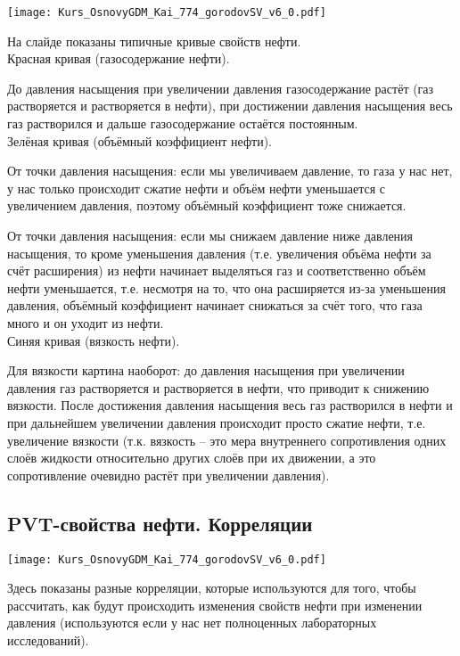 \documentclass[main.tex]{subfiles}
\begin{document}
\texttt{[image: Kurs\_OsnovyGDM\_Kai\_774\_gorodovSV\_v6\_0.pdf]}

На слайде показаны типичные кривые свойств нефти.
\\

Красная кривая (газосодержание нефти).

До давления насыщения при увеличении давления газосодержание растёт (газ растворяется и растворяется в нефти), при достижении давления насыщения весь газ растворился и дальше газосодержание остаётся постоянным.
\\

Зелёная кривая (объёмный коэффициент нефти).

От точки давления насыщения: если мы увеличиваем давление, то газа у нас нет, у нас только происходит сжатие нефти и объём нефти уменьшается с увеличением давления, поэтому объёмный коэффициент тоже снижается.

От точки давления насыщения: если мы снижаем давление ниже давления насыщения, то кроме уменьшения давления (т.е. увеличения объёма нефти за счёт расширения) из нефти начинает выделяться газ и соответственно объём нефти уменьшается, т.е. несмотря на то, что она расширяется из-за уменьшения давления, объёмный коэффициент начинает снижаться за счёт того, что газа много и он уходит из нефти.
\\

Синяя кривая (вязкость нефти).

Для вязкости картина наоборот: до давления насыщения при увеличении давления газ растворяется и растворяется в нефти, что приводит к снижению вязкости.
После достижения давления насыщения весь газ растворился в нефти и при дальнейшем увеличении давления происходит просто сжатие нефти, т.е. увеличение вязкости (т.к. вязкость -- это мера внутреннего сопротивления одних слоёв жидкости относительно других слоёв при их движении, а это сопротивление очевидно растёт при увеличении давления).

\subsection{PVT-свойства нефти. Корреляции}

\texttt{[image: Kurs\_OsnovyGDM\_Kai\_774\_gorodovSV\_v6\_0.pdf]}

Здесь показаны разные корреляции, которые используются для того, чтобы рассчитать, как будут происходить изменения свойств нефти при изменении давления (используются если у нас нет полноценных лабораторных исследований).
\end{document}
